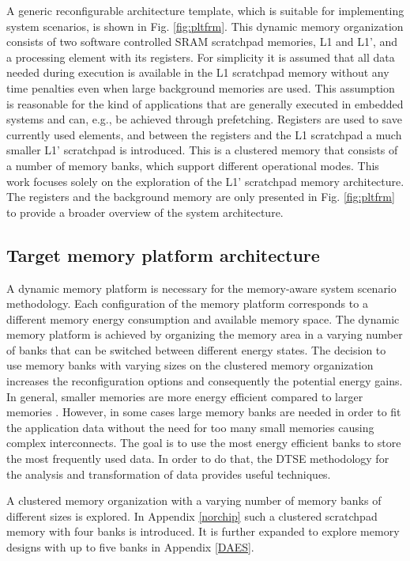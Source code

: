 A generic reconfigurable architecture template, which is suitable for implementing system scenarios, is shown in Fig. \ref{fig:pltfrm}. 
This dynamic memory organization consists of two software controlled SRAM scratchpad memories, L1 and L1', and a processing element with its registers. 
For simplicity it is assumed that all data needed during execution is available in the L1 scratchpad memory without any time penalties even when large background memories are used. 
This assumption is reasonable for the kind of applications that are generally executed in embedded systems and can, e.g., be achieved through prefetching. 
Registers are used to save currently used elements, and between the registers and the L1 scratchpad a much smaller L1' scratchpad is introduced. 
This is a clustered memory that consists of a number of memory banks, which support different operational modes.
This work focuses solely on the exploration of the L1' scratchpad memory architecture.
The registers and the background memory are only presented in Fig. \ref{fig:pltfrm} to provide a broader overview of the system architecture.

\subsection{Target memory platform architecture}

A dynamic memory platform is necessary for the memory-aware system scenario methodology. 
Each configuration of the memory platform corresponds to a different memory energy consumption and available memory space. 
The dynamic memory platform is achieved by organizing the memory area in a varying number of banks that can be switched between different energy states. 
The decision to use memory banks with varying sizes on the clustered memory organization increases the reconfiguration options and consequently the potential energy gains. 
In general, smaller memories are more energy efficient compared to larger memories \cite{steinke2002assigning}. 
However, in some cases large memory banks are needed in order to fit the application data without the need for too many small memories causing complex interconnects. 
The goal is to use the most energy efficient banks to store the most frequently used data. 
In order to do that, the DTSE methodology for the analysis and transformation of data provides useful techniques.

A clustered memory organization with a varying number of memory banks of different sizes is explored.
In  Appendix \ref{norchip} such a clustered scratchpad memory with four banks is introduced. 
It is further expanded to explore memory designs with up to five banks in Appendix \ref{DAES}.

